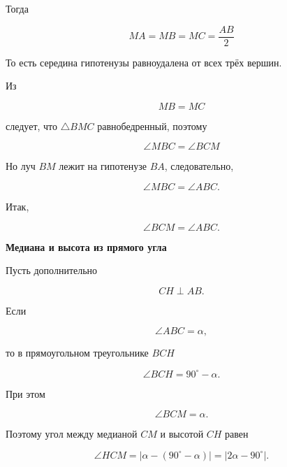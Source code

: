 \documentclass[a4paper,12pt]{article}
\newcommand{\subtopic}[1]{%
  \vspace{0.45em}
  {\large\bfseries\textcolor{accent}{#1}}\par
  \vspace{0.2em}
}
\begin{document}
Тогда

\[
\boxed{
MA=MB=MC=\frac{AB}{2}
}
\]

То есть середина гипотенузы равноудалена от всех трёх вершин.

\begin{center}
\end{center}

Из

\[
MB=MC
\]

следует, что \(\triangle BMC\) равнобедренный, поэтому

\[
\boxed{
\angle MBC=\angle BCM
}
\]

Но луч \(BM\) лежит на гипотенузе \(BA\), следовательно,

\[
\angle MBC=\angle ABC.
\]

Итак,

\[
\boxed{
\angle BCM=\angle ABC.
}
\]

\subtopic{Медиана и высота из прямого угла}

Пусть дополнительно

\[
CH\perp AB.
\]

Если

\[
\angle ABC=\alpha,
\]

то в прямоугольном треугольнике \(BCH\)

\[
\angle BCH=90^\circ-\alpha.
\]

При этом

\[
\angle BCM=\alpha.
\]

Поэтому угол между медианой \(CM\) и высотой \(CH\) равен

\[
\boxed{
\angle HCM
=
\left|
\alpha-(90^\circ-\alpha)
\right|
=
|2\alpha-90^\circ|.
}
\]
\end{document}
